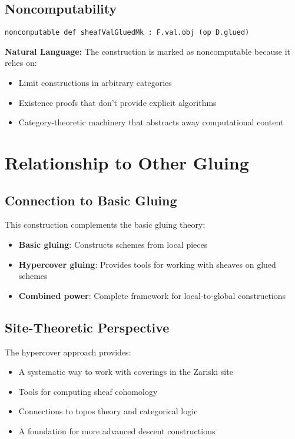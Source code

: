 \documentclass{article}
\theoremstyle{definition}
\begin{document}
\subsection{Noncomputability}

\begin{lstlisting}
noncomputable def sheafValGluedMk : F.val.obj (op D.glued)
\end{lstlisting}

\textbf{Natural Language:} The construction is marked as noncomputable because it relies on:
\begin{itemize}
\item Limit constructions in arbitrary categories
\item Existence proofs that don't provide explicit algorithms
\item Category-theoretic machinery that abstracts away computational content
\end{itemize}

\section{Relationship to Other Gluing}

\subsection{Connection to Basic Gluing}

This construction complements the basic gluing theory:
\begin{itemize}
\item \textbf{Basic gluing}: Constructs schemes from local pieces
\item \textbf{Hypercover gluing}: Provides tools for working with sheaves on glued schemes
\item \textbf{Combined power}: Complete framework for local-to-global constructions
\end{itemize}

\subsection{Site-Theoretic Perspective}

The hypercover approach provides:
\begin{itemize}
\item A systematic way to work with coverings in the Zariski site
\item Tools for computing sheaf cohomology
\item Connections to topos theory and categorical logic
\item A foundation for more advanced descent constructions
\end{itemize}
\end{document}
